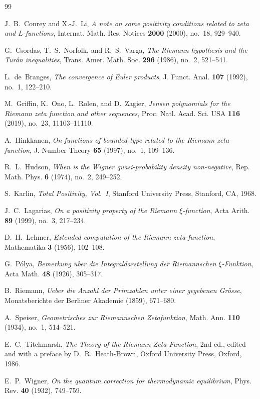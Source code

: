 \documentclass[11pt,a4paper,reqno]{amsart}
\theoremstyle{definition}
\theoremstyle{remark}
\numberwithin{equation}{section}
\begin{document}
\begin{thebibliography}{99}

J.~B.~Conrey and X.-J.~Li, \emph{A note on some positivity conditions related to zeta and $L$-functions}, Internat. Math. Res. Notices \textbf{2000} (2000), no.~18, 929--940.

G.~Csordas, T.~S.~Norfolk, and R.~S.~Varga, \emph{The Riemann hypothesis and the Tur\'an inequalities}, Trans. Amer. Math. Soc. \textbf{296} (1986), no.~2, 521--541.

L.~de~Branges, \emph{The convergence of Euler products}, J. Funct. Anal. \textbf{107} (1992), no.~1, 122--210.

M.~Griffin, K.~Ono, L.~Rolen, and D.~Zagier, \emph{Jensen polynomials for the Riemann zeta function and other sequences}, Proc. Natl. Acad. Sci. USA \textbf{116} (2019), no.~23, 11103--11110.

A.~Hinkkanen, \emph{On functions of bounded type related to the Riemann zeta-function}, J. Number Theory \textbf{65} (1997), no.~1, 109--136.

R.~L.~Hudson, \emph{When is the Wigner quasi-probability density non-negative}, Rep. Math. Phys. \textbf{6} (1974), no.~2, 249--252.

S.~Karlin, \emph{Total Positivity, Vol.~I}, Stanford University Press, Stanford, CA, 1968.

J.~C.~Lagarias, \emph{On a positivity property of the Riemann $\xi$-function}, Acta Arith. \textbf{89} (1999), no.~3, 217--234.

D.~H.~Lehmer, \emph{Extended computation of the Riemann zeta-function}, Mathematika \textbf{3} (1956), 102--108.

G.~P\'olya, \emph{Bemerkung \"uber die Integraldarstellung der Riemannschen $\xi$-Funktion}, Acta Math. \textbf{48} (1926), 305--317.

B.~Riemann, \emph{Ueber die Anzahl der Primzahlen unter einer gegebenen Gr\"osse}, Monatsberichte der Berliner Akademie (1859), 671--680.

A.~Speiser, \emph{Geometrisches zur Riemannschen Zetafunktion}, Math. Ann. \textbf{110} (1934), no.~1, 514--521.

E.~C.~Titchmarsh, \emph{The Theory of the Riemann Zeta-Function}, 2nd ed., edited and with a preface by D.~R.~Heath-Brown, Oxford University Press, Oxford, 1986.

E.~P.~Wigner, \emph{On the quantum correction for thermodynamic equilibrium}, Phys. Rev. \textbf{40} (1932), 749--759.

\end{thebibliography}
\end{document}
